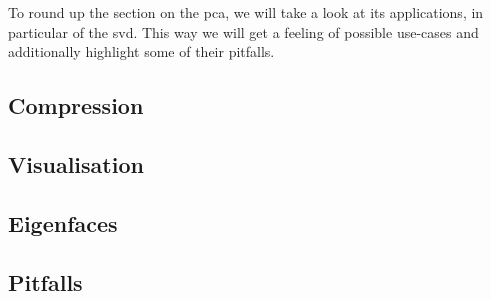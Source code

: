 To round up the section on the \acrlong{pca}, we will take a look at its applications, in particular of the \acrlong{svd}.
This way we will get a feeling of possible use-cases and additionally highlight some of their pitfalls.


\subsection{Compression}

\clearpage



\subsection{Visualisation}

\clearpage


\subsection{Eigenfaces} \label{sec:eigenfaces}

\clearpage

\subsection{Pitfalls}

\clearpage
